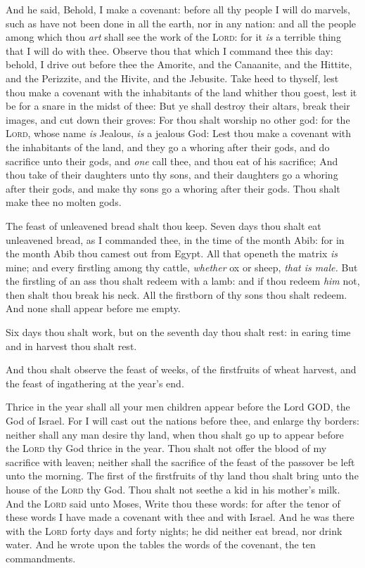 \documentclass[11pt,letterpaper,oneside]{memoir}
\begin{document}
And he said, Behold, I make a covenant: before all thy people I will do
marvels, such as have not been done in all the earth, nor in any nation:
and all the people among which thou \emph{art} shall see the work of the
\textsc{Lord}: for it \emph{is} a terrible thing that I will do with
thee. Observe thou that which I command thee this day: behold, I drive
out before thee the Amorite, and the Canaanite, and the Hittite, and the
Perizzite, and the Hivite, and the Jebusite. Take heed to thyself, lest
thou make a covenant with the inhabitants of the land whither thou
goest, lest it be for a snare in the midst of thee: But ye shall destroy
their altars, break their images, and cut down their groves: For thou
shalt worship no other god: for the \textsc{Lord}, whose name \emph{is}
Jealous, \emph{is} a jealous God: Lest thou make a covenant with the
inhabitants of the land, and they go a whoring after their gods, and do
sacrifice unto their gods, and \emph{one} call thee, and thou eat of his
sacrifice; And thou take of their daughters unto thy sons, and their
daughters go a whoring after their gods, and make thy sons go a whoring
after their gods. Thou shalt make thee no molten gods.

The feast of unleavened bread shalt thou keep. Seven days thou shalt eat
unleavened bread, as I commanded thee, in the time of the month Abib:
for in the month Abib thou camest out from Egypt. All that openeth the
matrix \emph{is} mine; and every firstling among thy cattle,
\emph{whether} ox or sheep, \emph{that is male. }But the firstling of an
ass thou shalt redeem with a lamb: and if thou redeem \emph{him} not,
then shalt thou break his neck. All the firstborn of thy sons thou shalt
redeem. And none shall appear before me empty.

Six days thou shalt work, but on the seventh day thou shalt rest: in
earing time and in harvest thou shalt rest.

And thou shalt observe the feast of weeks, of the firstfruits of wheat
harvest, and the feast of ingathering at the year's end.

Thrice in the year shall all your men children appear before the Lord
GOD, the God of Israel. For I will cast out the nations before thee, and
enlarge thy borders: neither shall any man desire thy land, when thou
shalt go up to appear before the \textsc{Lord} thy God thrice in the
year. Thou shalt not offer the blood of my sacrifice with leaven;
neither shall the sacrifice of the feast of the passover be left unto
the morning. The first of the firstfruits of thy land thou shalt bring
unto the house of the \textsc{Lord} thy God. Thou shalt not seethe a kid
in his mother's milk. And the \textsc{Lord} said unto Moses, Write thou
these words: for after the tenor of these words I have made a covenant
with thee and with Israel. And he was there with the \textsc{Lord} forty
days and forty nights; he did neither eat bread, nor drink water. And he
wrote upon the tables the words of the covenant, the ten commandments.
\end{document}
